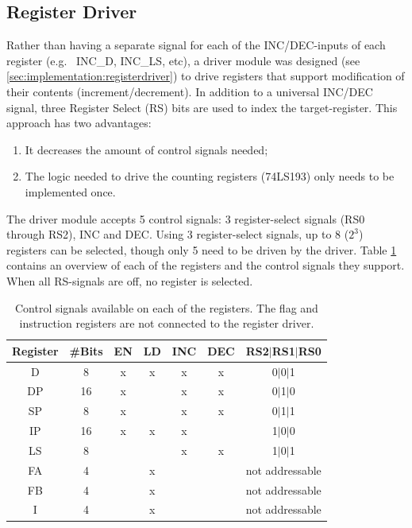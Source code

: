 \subsection{Register Driver} \label{sec:architecture:registerdriver}
Rather than having a separate signal for each of the INC/DEC-inputs of each register (e.g.~ INC\_D, INC\_LS, etc), a driver module was designed (see \ref{sec:implementation:registerdriver}) to drive registers that support modification of their contents (increment/decrement). In addition to a universal INC/DEC signal, three Register Select (RS) bits are used to index the target-register. This approach has two advantages:
\begin{enumerate}
\item It decreases the amount of control signals needed;
\item The logic needed to drive the counting registers (74LS193) only needs to be implemented once.
\end{enumerate}

The driver module accepts 5 control signals: 3 register-select signals (RS0 through RS2), INC and DEC. Using 3 register-select signals, up to 8 ($2^3$) registers can be selected, though only 5 need to be driven by the driver. Table \ref{tab:registers} contains an overview of each of the registers and the control signals they support. When all RS-signals are off, no register is selected.

\begin{table}[H]
  \centering
  \begin{tabular}{c|c|c|c|c|c|c}
    Register & \#Bits & EN  & LD  & INC  & DEC & RS2$|$RS1$|$RS0 \\ \hline 
    D        & 8      & x   & x   & x    & x   & 0$|$0$|$1 \\
    DP       & 16     & x   &     & x    & x   & 0$|$1$|$0 \\ 
    SP       & 8      & x   &     & x    & x   & 0$|$1$|$1 \\ 
    IP       & 16     & x   & x   & x    &     & 1$|$0$|$0 \\ 
    LS       & 8      &     &     & x    & x   & 1$|$0$|$1 \\ 
    FA       & 4      &     & x   &      &     & not addressable \\ 
    FB       & 4      &     & x   &      &     & not addressable  \\
    I        & 4      &     & x   &      &     & not addressable \\
  \end{tabular}
  \caption{Control signals available on each of the registers. The flag and instruction registers are not connected to the register driver.}
  \label{tab:registers}
\end{table}

